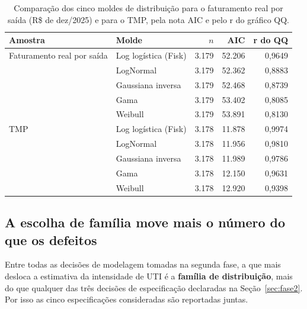 \begin{table}[H]
\centering
\caption{Comparação dos cinco moldes de distribuição para o faturamento
real por saída (R\$ de dez/2025) e para o TMP, pela nota AIC e pelo r do
gráfico QQ.}
\label{tab:familias}
\small
\begin{tabular}{llrrr}
\toprule
Amostra & Molde & $n$ & AIC & r do QQ \\
\midrule
Faturamento real por saída & Log logística (Fisk) & 3.179 & 52.206 & 0,9649 \\
                & LogNormal            & 3.179 & 52.362 & 0,8883 \\
                & Gaussiana inversa    & 3.179 & 52.468 & 0,8739 \\
                & Gama                 & 3.179 & 53.402 & 0,8085 \\
                & Weibull              & 3.179 & 53.891 & 0,8130 \\
\midrule
TMP & Log logística (Fisk) & 3.178 & 11.878 & 0,9974 \\
                     & LogNormal            & 3.178 & 11.956 & 0,9810 \\
                     & Gaussiana inversa    & 3.178 & 11.989 & 0,9786 \\
                     & Gama                 & 3.178 & 12.150 & 0,9631 \\
                     & Weibull              & 3.178 & 12.920 & 0,9398 \\
\bottomrule
\end{tabular}
\end{table}


\subsection*{A escolha de família move mais o número do que os defeitos}

Entre todas as decisões de modelagem tomadas na segunda fase, a que mais
desloca a estimativa da intensidade de UTI é a \textbf{família de
distribuição}, mais do que qualquer das três decisões de especificação
declaradas na Seção~\ref{sec:fase2}. Por isso as cinco especificações
consideradas são reportadas juntas.

